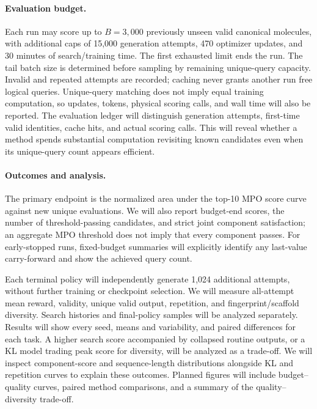 \documentclass{article}
\begin{document}
\paragraph{Evaluation budget.}
Each run may score up to $B=3{,}000$ previously unseen valid canonical molecules,
with additional caps of 15,000 generation attempts, 470 optimizer updates, and
30 minutes of search/training time. The first exhausted limit ends the run.
The tail batch size is determined before sampling by remaining unique-query
capacity. Invalid and repeated attempts are recorded; caching never grants
another run free logical queries. Unique-query matching does not imply equal
training computation, so updates, tokens, physical scoring calls, and wall time
will also be reported. The evaluation ledger will distinguish generation
attempts, first-time valid identities, cache hits, and actual scoring calls.
This will reveal whether a method spends substantial computation revisiting
known candidates even when its unique-query count appears efficient.

\paragraph{Outcomes and analysis.}
The primary endpoint is the normalized area under the top-10 MPO score curve
against new unique evaluations. We will also report budget-end scores, the
number of threshold-passing candidates, and strict joint component satisfaction;
an aggregate MPO threshold does not imply that every component passes. For
early-stopped runs, fixed-budget summaries will explicitly identify any
last-value carry-forward and show the achieved query count.

Each terminal policy will independently generate 1,024 additional attempts,
without further training or checkpoint selection. We will measure all-attempt
mean reward, validity, unique valid output, repetition, and fingerprint/scaffold
diversity. Search histories and final-policy samples will be analyzed separately.
Results will show every seed, means and variability, and paired differences for
each task. A higher search score accompanied by collapsed routine outputs, or a
KL model trading peak score for diversity, will be analyzed as a trade-off.
We will inspect component-score and sequence-length distributions alongside KL
and repetition curves to explain these outcomes. Planned figures will include
budget--quality curves, paired method comparisons, and a summary of the
quality--diversity trade-off.
\end{document}
